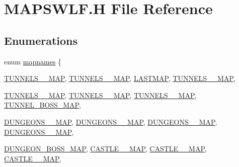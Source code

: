 \hypertarget{MAPSWLF_8H}{
\section{MAPSWLF.H File Reference}
\label{MAPSWLF_8H}
}
\subsection*{Enumerations}
\begin{DoxyCompactItemize}
\item 
enum \hyperlink{MAPSWLF_8H_a1949852ef0462081a2b248dd4918bb86}{mapnames} \{ \par
\hyperlink{MAPSSDM_8H_a1949852ef0462081a2b248dd4918bb86acbdf704da923641aa047528fadd773fa}{TUNNELS\_\_\-MAP}, 
\hyperlink{MAPSSDM_8H_a1949852ef0462081a2b248dd4918bb86a0714d98acd387ceab72b37c2ce15337b}{TUNNELS\_\_\-MAP}, 
\hyperlink{MAPSSDM_8H_a1949852ef0462081a2b248dd4918bb86ad3af5aeeef56724be68af11d0a6680b3}{LASTMAP}, 
\hyperlink{MAPSSOD_8H_a1949852ef0462081a2b248dd4918bb86acbdf704da923641aa047528fadd773fa}{TUNNELS\_\_\-MAP}, 
\par
\hyperlink{MAPSSOD_8H_a1949852ef0462081a2b248dd4918bb86a0714d98acd387ceab72b37c2ce15337b}{TUNNELS\_\_\-MAP}, 
\hyperlink{MAPSSOD_8H_a1949852ef0462081a2b248dd4918bb86a0d874dc7ecc82a838419319fdf1e8981}{TUNNELS\_\_\-MAP}, 
\hyperlink{MAPSSOD_8H_a1949852ef0462081a2b248dd4918bb86acaaf614245869150fddf14e70c58e814}{TUNNELS\_\_\-MAP}, 
\hyperlink{MAPSSOD_8H_a1949852ef0462081a2b248dd4918bb86a00ffe67ecf2d79d6e249734e3c10f835}{TUNNEL\_\-BOSS\_\-MAP}, 
\par
\hyperlink{MAPSSOD_8H_a1949852ef0462081a2b248dd4918bb86a2a41440fb231f456ba48a61b3750a433}{DUNGEONS\_\_\-MAP}, 
\hyperlink{MAPSSOD_8H_a1949852ef0462081a2b248dd4918bb86a71604e9c0be7e84b7a077e1014d16551}{DUNGEONS\_\_\-MAP}, 
\hyperlink{MAPSSOD_8H_a1949852ef0462081a2b248dd4918bb86ac36508495618f8433a43efca3cb5db5d}{DUNGEONS\_\_\-MAP}, 
\hyperlink{MAPSSOD_8H_a1949852ef0462081a2b248dd4918bb86a708337f0295e8e4da5d955451956a603}{DUNGEONS\_\_\-MAP}, 
\par
\hyperlink{MAPSSOD_8H_a1949852ef0462081a2b248dd4918bb86a1b3c9e6cc77c7f84b6ae038051781e3d}{DUNGEON\_\-BOSS\_\-MAP}, 
\hyperlink{MAPSSOD_8H_a1949852ef0462081a2b248dd4918bb86a4c9c00b088ae5f84423f30ea9fa44f33}{CASTLE\_\_\-MAP}, 
\hyperlink{MAPSSOD_8H_a1949852ef0462081a2b248dd4918bb86acb20a9eff2b66ec774cd4516ad2c6d13}{CASTLE\_\_\-MAP}, 
\hyperlink{MAPSSOD_8H_a1949852ef0462081a2b248dd4918bb86a06b22b4044c73d114ec301f7e57fb22c}{CASTLE\_\_\-MAP}, 

\end{DoxyCompactItemize}
